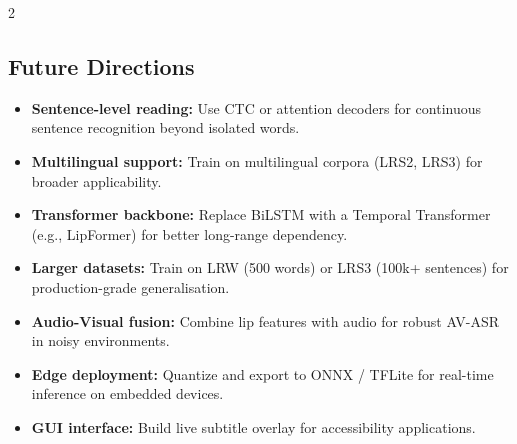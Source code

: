 \documentclass[10pt, a4paper]{article}
\begin{document}
\begin{multicols}{2}
\subsection{Future Directions}
\begin{itemize}
  \item \textbf{Sentence-level reading:} Use CTC or attention decoders
        for continuous sentence recognition beyond isolated words.
  \item \textbf{Multilingual support:} Train on multilingual corpora
        (LRS2, LRS3) for broader applicability.
  \item \textbf{Transformer backbone:} Replace BiLSTM with a Temporal
        Transformer (e.g., LipFormer) for better long-range dependency.
  \item \textbf{Larger datasets:} Train on LRW (500 words) or LRS3
        (100k+ sentences) for production-grade generalisation.
  \item \textbf{Audio-Visual fusion:} Combine lip features with audio
        for robust AV-ASR in noisy environments.
  \item \textbf{Edge deployment:} Quantize and export to ONNX / TFLite
        for real-time inference on embedded devices.
  \item \textbf{GUI interface:} Build live subtitle overlay for
        accessibility applications.
\end{itemize}

\end{multicols}
\end{document}

